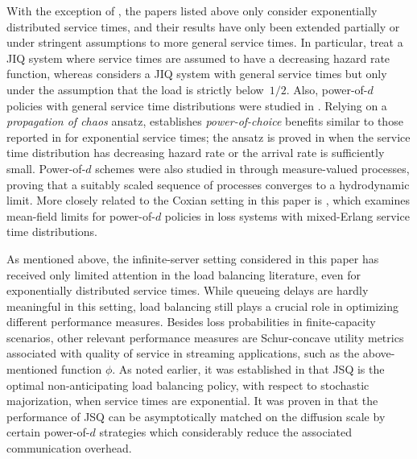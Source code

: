 \documentclass[a4paper, 12pt]{article}
\theoremstyle{definition}
\begin{document}
With the exception of \cite{stolyar2015pull}, the papers listed above only consider exponentially distributed service times, and their results have only been extended partially or under stringent assumptions to more general service times. In particular, \cite{stolyar2015pull,stolyar2017pull} treat a JIQ system where service times are assumed to have a decreasing hazard rate function, whereas \cite{foss2017large} considers a JIQ system with general service times but only under the assumption that the load is strictly below~$1/2$. Also, power-of-$d$ policies with general service time distributions were studied in \cite{bramson2010randomized,bramson2012asymptotic}. Relying on a \emph{propagation of chaos} ansatz, \cite{bramson2010randomized} establishes \emph{power-of-choice} benefits similar to those reported in \cite{mitzenmacher2001power,vvedenskaya1996queueing} for exponential service times; the ansatz is proved in \cite{bramson2012asymptotic} when the service time distribution has decreasing hazard rate or the arrival rate is sufficiently small. Power-of-$d$ schemes were also studied in \cite{aghajani2018pde,aghajani2019hydrodynamic} through measure-valued processes, proving that a suitably scaled sequence of processes converges to a hydrodynamic limit. More closely related to the Coxian setting in this paper is \cite{vasantam2017mean}, which examines mean-field limits for power-of-$d$ policies in loss systems with mixed-Erlang service time distributions.

As mentioned above, the infinite-server setting considered in this paper has received only limited attention in the load balancing literature, even for exponentially distributed service times. While queueing delays are hardly meaningful in this setting, load balancing still plays a crucial role in optimizing different performance measures. Besides loss probabilities in finite-capacity scenarios, other relevant performance measures are Schur-concave utility metrics associated with quality of service in streaming applications, such as the above-mentioned function $\phi$. As noted earlier, it was established in \cite{menich1991optimality,sparaggis1993extremal} that JSQ is the optimal non-anticipating load balancing policy, with respect to stochastic majorization, when service times are exponential. It was proven in \cite{mukherjee2020asymptotic} that the performance of JSQ can be asymptotically matched on the diffusion scale by certain power-of-$d$ strategies which considerably reduce the associated communication overhead.
\end{document}
